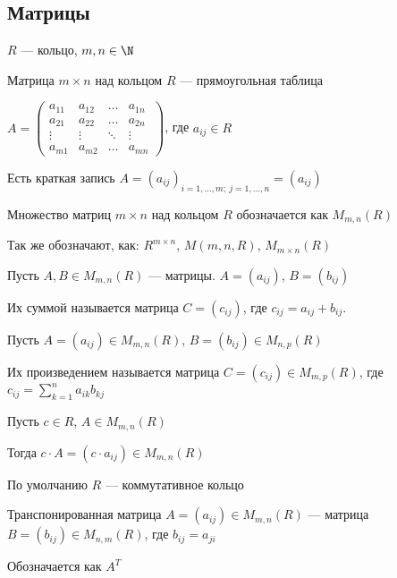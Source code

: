 \subsection{Матрицы}

\begin{defn}
    $R$ --- кольцо, $m, n \in \N$

    Матрица $m \times n$ над кольцом $R$ --- прямоугольная таблица

    $A = \begin{pmatrix}
        a_{11} & a_{12} & \dots & a_{1n} \\
        a_{21} & a_{22} & \dots & a_{2n} \\
        \vdots & \vdots & \ddots & \vdots \\
        a_{m1} & a_{m2} & \dots & a_{mn}
    \end{pmatrix}$, где $a_{ij} \in R$

    Есть краткая запись $A = (a_{ij})_{i = 1, \ldots, m;~j = 1, \ldots, n} = (a_{ij})$
\end{defn}

\begin{defn}
    Множество матриц $m \times n$ над кольцом $R$ обозначается как $M_{m, n}(R)$

    Так же обозначают, как: $R^{m \times n}$, $M(m, n, R)$, $M_{m \times n}(R)$
\end{defn}

Пусть $A, B \in M_{m, n}(R)$ --- матрицы. $A = (a_{ij})$, $B = (b_{ij})$

Их суммой называется матрица $C = (c_{ij})$, где $c_{ij} = a_{ij} + b_{ij}$.

Пусть $A = (a_{ij}) \in M_{m, n}(R)$, $B = (b_{ij}) \in M_{n, p}(R)$

Их произведением называется матрица $C = (c_{ij}) \in M_{m, p}(R)$, где $c_{ij} = \sum\limits_{k = 1}^n a_{ik} b_{kj}$

Пусть $c \in R$, $A \in M_{m, n}(R)$

Тогда $c \cdot A = (c \cdot a_{ij}) \in M_{m, n}(R)$

\begin{notice}
    По умолчанию $R$ --- коммутативное кольцо
\end{notice}

\begin{defn}
    Транспонированная матрица $A = (a_{ij}) \in M_{m, n}(R)$ --- матрица $B = (b_{ij}) \in M_{n, m}(R)$, где $b_{ij} = a_{ji}$

    Обозначается как $A^T$
\end{defn}

